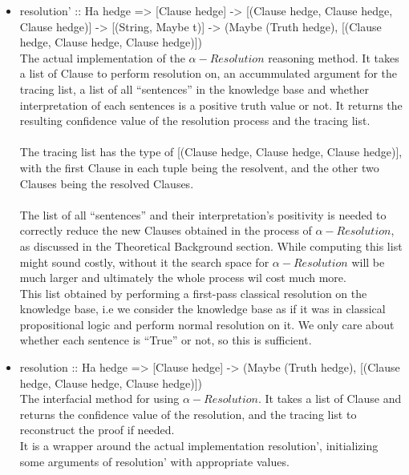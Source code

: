 \documentclass[../gr-final.tex]{subfiles}
\begin{document}
\begin{itemize}
        \item resolution' :: Ha hedge => [Clause hedge] ->
        [(Clause hedge, Clause hedge, Clause hedge)] -> [(String, Maybe t)] -> (Maybe (Truth
        hedge), [(Clause hedge, Clause hedge, Clause hedge)])\\
        The actual implementation of the $\alpha-Resolution$
        reasoning method. It takes a list of Clause to perform
        resolution on, an accummulated argument for the tracing
        list, a list of all ``sentences'' in the knowledge base
        and whether interpretation of each sentences is a
        positive truth value or not. It returns the resulting
        confidence value of the resolution process and the
        tracing list.\\\\
        The tracing list has the type of [(Clause hedge, Clause
        hedge, Clause hedge)], with the first Clause in each
        tuple being the resolvent, and the other two Clauses
        being the resolved Clauses.\\\\
        The list of all ``sentences'' and their interpretation's
        positivity is needed to correctly reduce the new Clauses
        obtained in the process of $\alpha-Resolution$, as
        discussed in the Theoretical Background section. While
        computing this list might sound costly, without it the
        search space for $\alpha-Resolution$ will be much larger
        and ultimately the whole process wil cost much more.\\        
        This list obtained by performing a first-pass
        classical resolution on the knowledge base, i.e we
        consider the knowledge base as if it was in classical
        propositional logic and perform normal resolution on it.
        We only care about whether each sentence is ``True'' or
        not, so this is sufficient.    
        


        \item resolution :: Ha hedge => [Clause hedge] -> (Maybe
         (Truth hedge), [(Clause hedge, Clause hedge, Clause
         hedge)])\\
                The interfacial method for using
                $\alpha-Resolution$. It takes a list of Clause
                and returns the confidence value of the
                resolution, and the tracing list to reconstruct
                the proof if needed.\\
                It is a wrapper around the
                actual implementation resolution', initializing
                some arguments of resolution' with appropriate
                values. 
\end{itemize}
\end{document}
